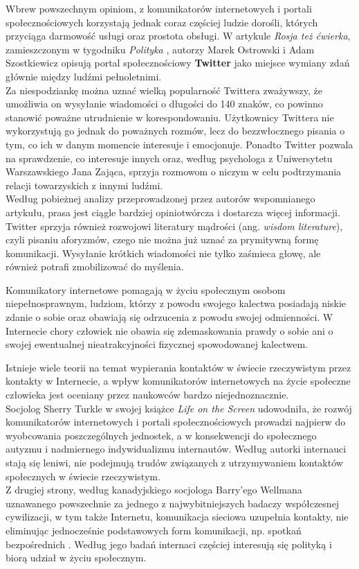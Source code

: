 \documentclass[a4paper,12pt]{article}
\begin{document}
\par Wbrew powszechnym opiniom, z komunikatorów internetowych i portali społecznościowych korzystają jednak coraz częściej ludzie dorośli, których przyciąga darmowość usługi oraz prostota obsługi. W artykule \emph{Rosja też ćwierka}, zamieszczonym w tygodniku \emph{Polityka} \cite{PO}, autorzy Marek Ostrowski i Adam Szostkiewicz opisują portal społecznościowy \textbf{Twitter} jako miejsce wymiany zdań głównie między ludźmi pełnoletnimi.\\
Za niespodziankę można uznać wielką popularność Twittera zważywszy, że umożliwia on wysyłanie wiadomości o długości do 140 znaków, co powinno stanowić poważne utrudnienie w korespondowaniu. Użytkownicy Twittera nie wykorzystują go jednak do poważnych rozmów, lecz do bezzwłocznego pisania o tym, co ich w danym momencie interesuje i emocjonuje. Ponadto Twitter pozwala na sprawdzenie, co interesuje innych oraz, według psychologa z Uniwersytetu Warszawskiego Jana Zająca, sprzyja rozmowom o niczym w celu podtrzymania relacji towarzyskich z innymi ludźmi.\\
Według pobieżnej analizy przeprowadzonej przez autorów wspomnianego artykułu, prasa jest ciągle bardziej opiniotwórcza i dostarcza więcej informacji.\\
Twitter sprzyja również rozwojowi literatury mądrości (ang. \textit{wisdom literature}), czyli pisaniu aforyzmów, czego nie można już uznać za prymitywną formę komunikacji. Wysyłanie krótkich wiadomości nie tylko zaśmieca głowę, ale również potrafi zmobilizować do myślenia.

\par Komunikatory internetowe pomagają w życiu społecznym osobom niepełnosprawnym, ludziom, którzy z powodu swojego kalectwa posiadają niskie zdanie o sobie oraz obawiają się odrzucenia z powodu swojej odmienności. W Internecie chory człowiek nie obawia się zdemaskowania prawdy o sobie ani o swojej ewentualnej nieatrakcyjności fizycznej spowodowanej kalectwem.

\par Istnieje wiele teorii na temat wypierania kontaktów w świecie rzeczywistym przez kontakty w Internecie, a wpływ komunikatorów internetowych na życie społeczne człowieka jest oceniany przez naukowców bardzo niejednoznacznie.\\
Socjolog Sherry Turkle w swojej książce \emph{Life on the Screen} \cite{ST} udowodniła, że rozwój komunikatorów internetowych i portali społecznościowych prowadzi najpierw do wyobcowania poszczególnych jednostek, a w konsekwencji do społecznego autyzmu i nadmiernego indywidualizmu internautów.
Według autorki internauci stają się leniwi, nie podejmują trudów związanych z utrzymywaniem kontaktów społecznych w świecie rzeczywistym.\\
Z drugiej strony, według kanadyjskiego socjologa Barry'ego Wellmana uznawanego powszechnie za jednego z najwybitniejszych badaczy współczesnej cywilizacji, w tym także Internetu, komunikacja sieciowa uzupełnia kontakty, nie eliminując jednocześnie podstawowych form komunikacji, np. spotkań bezpośrednich \cite{OU}. Według jego badań internaci częściej interesują się polityką i biorą udział w życiu społecznym.
\end{document}
